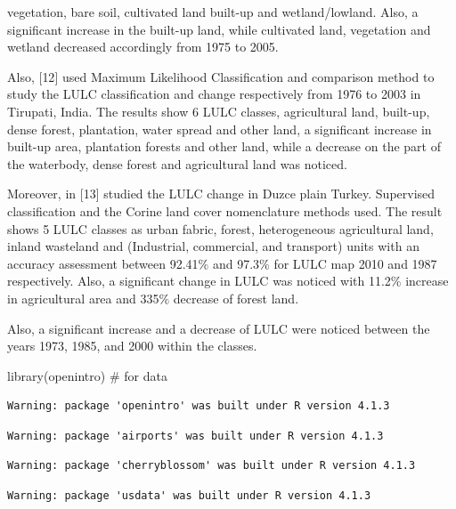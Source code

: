 \documentclass[
  letterpaper,
  DIV=11,
  numbers=noendperiod]{scrartcl}
\newenvironment{Shaded}{\begin{snugshade}}{\end{snugshade}}
\newcommand{\CommentTok}[1]{\textcolor[rgb]{0.37,0.37,0.37}{#1}}
\newcommand{\FunctionTok}[1]{\textcolor[rgb]{0.28,0.35,0.67}{#1}}
\newcommand{\NormalTok}[1]{\textcolor[rgb]{0.00,0.23,0.31}{#1}}
\begin{document}
vegetation, bare soil, cultivated land built-up and wetland/lowland.
Also, a significant increase in the built-up land, while cultivated
land, vegetation and wetland decreased accordingly from 1975 to 2005.

Also, {[}12{]} used Maximum Likelihood Classification and comparison
method to study the LULC classification and change respectively from
1976 to 2003 in Tirupati, India. The results show 6 LULC classes,
agricultural land, built-up, dense forest, plantation, water spread and
other land, a significant increase in built-up area, plantation forests
and other land, while a decrease on the part of the waterbody, dense
forest and agricultural land was noticed.

Moreover, in {[}13{]} studied the LULC change in Duzce plain Turkey.
Supervised classification and the Corine land cover nomenclature methods
used. The result shows 5 LULC classes as urban fabric, forest,
heterogeneous agricultural land, inland wasteland and (Industrial,
commercial, and transport) units with an accuracy assessment between
92.41\(\%\) and 97.3\(\%\) for LULC map 2010 and 1987 respectively.
Also, a significant change in LULC was noticed with 11.2\(\%\) increase
in agricultural area and 335\(\%\) decrease of forest land.

Also, a significant increase and a decrease of LULC were noticed between
the years 1973, 1985, and 2000 within the classes.

\begin{Shaded}
\begin{Highlighting}[]
\FunctionTok{library}\NormalTok{(openintro)  }\CommentTok{\# for data}
\end{Highlighting}
\end{Shaded}

\begin{verbatim}
Warning: package 'openintro' was built under R version 4.1.3
\end{verbatim}

\begin{verbatim}
Warning: package 'airports' was built under R version 4.1.3
\end{verbatim}

\begin{verbatim}
Warning: package 'cherryblossom' was built under R version 4.1.3
\end{verbatim}

\begin{verbatim}
Warning: package 'usdata' was built under R version 4.1.3
\end{verbatim}
\end{document}
